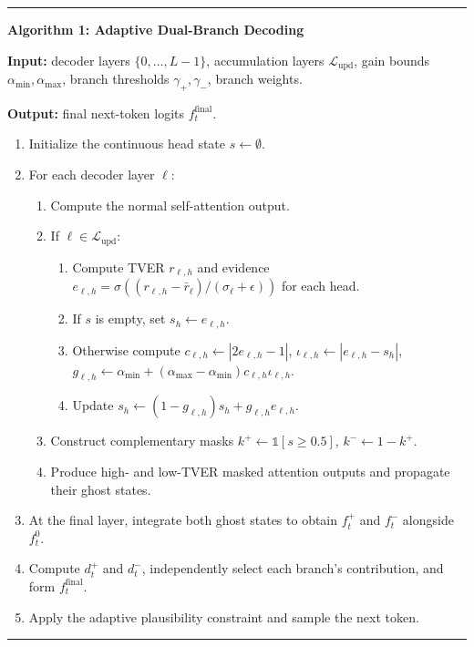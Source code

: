 \begin{center}
\begin{minipage}{0.95\linewidth}
\hrule
\vspace{0.5em}
\noindent\textbf{Algorithm 1: Adaptive Dual-Branch Decoding}
\vspace{0.25em}

\noindent\textbf{Input:} decoder layers $\{0,\ldots,L-1\}$, accumulation layers $\mathcal{L}_{\mathrm{upd}}$, gain bounds $\alpha_{\min},\alpha_{\max}$, branch thresholds $\gamma_{+},\gamma_{-}$, branch weights.\par
\noindent\textbf{Output:} final next-token logits $f_t^{\mathrm{final}}$.
\begin{enumerate}
    \item Initialize the continuous head state $s \leftarrow \emptyset$.
    \item For each decoder layer $\ell$:
    \begin{enumerate}
        \item Compute the normal self-attention output.
        \item If $\ell \in \mathcal{L}_{\mathrm{upd}}$:
        \begin{enumerate}
            \item Compute TVER $r_{\ell,h}$ and evidence $e_{\ell,h} = \sigma((r_{\ell,h}-\bar{r}_{\ell})/(\sigma_{\ell}+\epsilon))$ for each head.
            \item If $s$ is empty, set $s_h \leftarrow e_{\ell,h}$.
            \item Otherwise compute $c_{\ell,h} \leftarrow |2e_{\ell,h}-1|$, $\iota_{\ell,h} \leftarrow |e_{\ell,h}-s_h|$, $g_{\ell,h} \leftarrow \alpha_{\min}+(\alpha_{\max}-\alpha_{\min})c_{\ell,h}\iota_{\ell,h}$.
            \item Update $s_h \leftarrow (1-g_{\ell,h})s_h + g_{\ell,h}e_{\ell,h}$.
        \end{enumerate}
        \item Construct complementary masks $k^{+} \leftarrow \mathbb{1}[s \geq 0.5]$, $k^{-} \leftarrow 1-k^{+}$.
        \item Produce high- and low-TVER masked attention outputs and propagate their ghost states.
    \end{enumerate}
    \item At the final layer, integrate both ghost states to obtain $f_t^{+}$ and $f_t^{-}$ alongside $f_t^{0}$.
    \item Compute $d_t^{+}$ and $d_t^{-}$, independently select each branch's contribution, and form $f_t^{\mathrm{final}}$.
    \item Apply the adaptive plausibility constraint and sample the next token.
\end{enumerate}
\hrule
\end{minipage}
\end{center}

